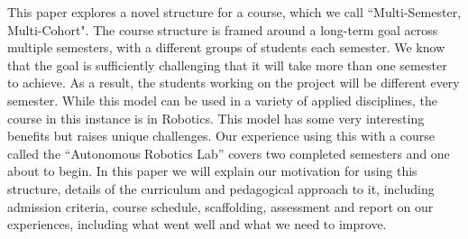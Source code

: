 This paper explores a novel structure for a course, which we call ``Multi-Semester, Multi-Cohort". The course structure is framed around a long-term goal across multiple semesters, with a different groups of students each semester. We know that the goal is sufficiently challenging that it will take more than one semester to achieve. As a result, the students working on the project will be different every semester. While this model can be used in a variety of applied disciplines, the course in this instance is in Robotics. This model has some very interesting benefits but raises unique challenges. Our experience using this with a course called the ``Autonomous Robotics Lab'' covers two completed semesters and one about to begin. In this paper we will explain our motivation for using this structure, details of the curriculum and pedagogical approach to it, including admission criteria, course schedule, scaffolding, assessment and report on our experiences, including what went well and what we need to improve.
